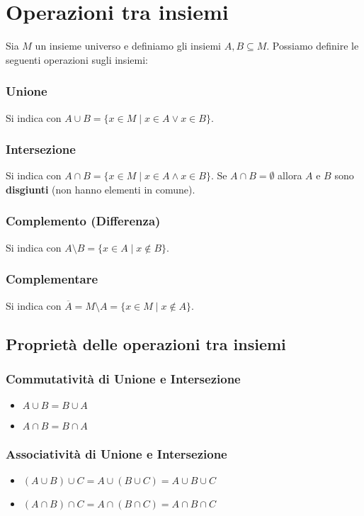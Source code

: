 \section{Operazioni tra insiemi}
Sia $M$ un insieme universo e definiamo gli insiemi $A, B \subseteq M$. Possiamo definire le seguenti operazioni sugli insiemi:

\subsubsection{Unione}
Si indica con $A \cup B = \{x \in M \mid x \in A \lor x \in B\}$.

\subsubsection{Intersezione}
Si indica con $A \cap B = \{x \in M \mid x \in A \land x \in B\}$. Se $A \cap B = \emptyset$ allora $A$ e $B$ sono \textbf{disgiunti} (non hanno elementi in comune).

\subsubsection{Complemento (Differenza)}
Si indica con $A \setminus B = \{x \in A \mid x \notin B\}$.

\subsubsection{Complementare}
Si indica con $\overline{A} = M \setminus A = \{x \in M \mid x \notin A\}$.

\subsection{Proprietà delle operazioni tra insiemi}

\subsubsection{Commutatività di Unione e Intersezione}
\begin{itemize}
    \item $A \cup B = B \cup A$
    \item $A \cap B = B \cap A$
\end{itemize}

\subsubsection{Associatività di Unione e Intersezione}
\begin{itemize}
    \item $(A \cup B) \cup C = A \cup (B \cup C) = A \cup B \cup C$
    \item $(A \cap B) \cap C = A \cap (B \cap C) = A \cap B \cap C$
\end{itemize}

